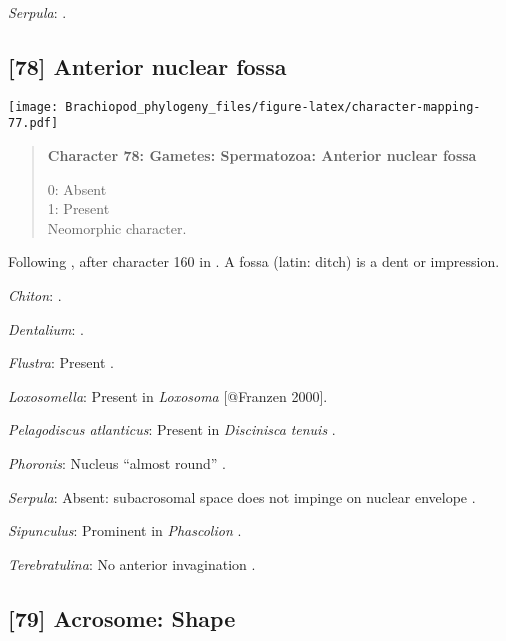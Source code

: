 \documentclass[openany]{book}
\theoremstyle{definition}
\theoremstyle{definition}
\theoremstyle{definition}
\theoremstyle{remark}
\begin{document}
\hypertarget{Serpula-coding-77}{}
\emph{Serpula}: \citet{Gherardi2011}.

\subsection*{{[}78{]} Anterior nuclear
fossa}\label{anterior-nuclear-fossa}

\texttt{[image: Brachiopod\_phylogeny\_files/figure-latex/character-mapping-77.pdf]}

\begin{quote}
\textbf{Character 78: Gametes: Spermatozoa: Anterior nuclear fossa}

0: Absent\\
1: Present\\
Neomorphic character.
\end{quote}

Following \citet{Smith2012}, after character 160 in \citet{Giribet2002}.
A fossa (latin: ditch) is a dent or impression.

\hypertarget{Chiton-coding-78}{}
\emph{Chiton}: \citet{BucklandNicks1988}.

\hypertarget{Dentalium-coding-78}{}
\emph{Dentalium}: \citet{DufresneDube1983}.

\hypertarget{Flustra-coding-78}{}
\emph{Flustra}: Present \citep[in \emph{Tubulipora};][]{Franzen1984}.

\hypertarget{Loxosomella-coding-78}{}
\emph{Loxosomella}: Present in \emph{Loxosoma} {[}@Franzen 2000{]}.

\hypertarget{Pelagodiscus_atlanticus-coding-78}{}
\emph{Pelagodiscus atlanticus}: Present in \emph{Discinisca}
\emph{tenuis} \citep{Hodgson1994Ultrastructureof}.

\hypertarget{Phoronis-coding-78}{}
\emph{Phoronis}: Nucleus ``almost round''
\citep{Reunov2004Ultrastructuralstudy}.

\hypertarget{Serpula-coding-78}{}
\emph{Serpula}: Absent: subacrosomal space does not impinge on nuclear
envelope \citep{Gherardi2011}.

\hypertarget{Sipunculus-coding-78}{}
\emph{Sipunculus}: Prominent in \emph{Phascolion} \citep{Rice1993}.

\hypertarget{Terebratulina-coding-78}{}
\emph{Terebratulina}: No anterior invagination
\citep{Hodgson1994Ultrastructureof}.

\subsection*{{[}79{]} Acrosome: Shape}\label{acrosome-shape}
\end{document}
